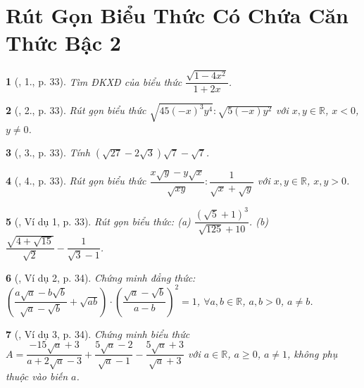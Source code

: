 \documentclass{article}
\newtheorem{baitoan}{}%
\begin{document}

\section{Rút Gọn Biểu Thức Có Chứa Căn Thức Bậc 2}

\begin{baitoan}[\cite{Binh_boi_duong_Toan_9_tap_1}, 1., p. 33]
	Tìm {\rm ĐKXĐ} của biểu thức $\dfrac{\sqrt{1 - 4x^2}}{1 + 2x}$.
\end{baitoan}

\begin{baitoan}[\cite{Binh_boi_duong_Toan_9_tap_1}, 2., p. 33]
	Rút gọn biểu thức $\sqrt{45(-x)^3y^4}:\sqrt{5(-x)y^2}$ với $x,y\in\mathbb{R}$, $x < 0$, $y\ne0$.
\end{baitoan}

\begin{baitoan}[\cite{Binh_boi_duong_Toan_9_tap_1}, 3., p. 33]
	Tính $(\sqrt{27} - 2\sqrt{3})\sqrt{7} - \sqrt{7}$.
\end{baitoan}

\begin{baitoan}[\cite{Binh_boi_duong_Toan_9_tap_1}, 4., p. 33]
	Rút gọn biểu thức $\dfrac{x\sqrt{y} - y\sqrt{x}}{\sqrt{xy}}:\dfrac{1}{\sqrt{x} + \sqrt{y}}$ với $x,y\in\mathbb{R}$, $x,y > 0$.
\end{baitoan}

\begin{baitoan}[\cite{Binh_boi_duong_Toan_9_tap_1}, Ví dụ 1, p. 33]
	Rút gọn biểu thức: (a) $\dfrac{(\sqrt{5} + 1)^3}{\sqrt{125} + 10}$. (b) $\dfrac{\sqrt{4 + \sqrt{15}}}{\sqrt{2}} - \dfrac{1}{\sqrt{3} - 1}$.
\end{baitoan}

\begin{baitoan}[\cite{Binh_boi_duong_Toan_9_tap_1}, Ví dụ 2, p. 34]
	Chứng minh đẳng thức: $\left(\dfrac{a\sqrt{a} - b\sqrt{b}}{\sqrt{a} - \sqrt{b}} + \sqrt{ab}\right)\cdot\left(\dfrac{\sqrt{a} - \sqrt{b}}{a - b}\right)^2 = 1$, $\forall a,b\in\mathbb{R}$, $a,b > 0$, $a\ne b$.
\end{baitoan}

\begin{baitoan}[\cite{Binh_boi_duong_Toan_9_tap_1}, Ví dụ 3, p. 34]
	Chứng minh biểu thức $A = \dfrac{-15\sqrt{a} + 3}{a + 2\sqrt{a} - 3} + \dfrac{5\sqrt{a} - 2}{\sqrt{a} - 1} - \dfrac{5\sqrt{a} + 3}{\sqrt{a} + 3}$ với $a\in\mathbb{R}$, $a\ge0$, $a\ne1$, không phụ thuộc vào biến $a$.
\end{baitoan}
\end{document}
